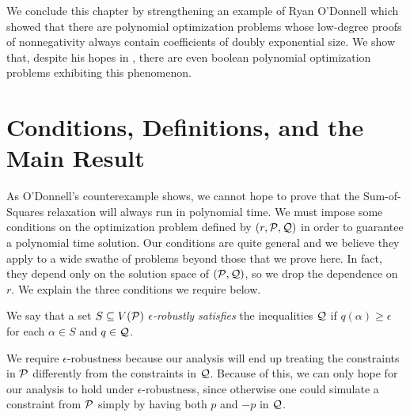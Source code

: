 We conclude this chapter by strengthening an example of Ryan O'Donnell which showed that there are polynomial optimization problems whose low-degree proofs of nonnegativity always contain coefficients of doubly exponential size. We show that, despite his hopes in \cite{ODon16}, there are even boolean polynomial optimization problems exhibiting this phenomenon. 

\section{Conditions, Definitions, and the Main Result}
As O'Donnell's counterexample shows, we cannot hope to prove that the Sum-of-Squares relaxation will always run in polynomial time. We must impose some conditions on the optimization problem defined by $(r, \mathcal P, \mathcal Q)$ in order to guarantee a polynomial time solution. Our conditions are quite general and we believe they apply to a wide swathe of problems beyond those that we prove here. In fact, they depend only on the solution space of $(\mathcal P, \mathcal Q)$, so we drop the dependence on $r$. We explain the three conditions we require below.

\begin{definition}
We say that a set $S \subseteq V(\mathcal P)$ \emph{$\epsilon$-robustly satisfies} the inequalities $\mathcal Q$ if $q(\alpha) \geq \epsilon$ for each $\alpha \in S$ and $q \in \mathcal Q$. 
\end{definition}
We require $\epsilon$-robustness because our analysis will end up treating the constraints in $\mathcal P$ differently from the constraints in $\mathcal Q$.
Because of this, we can only hope for our analysis to hold under $\epsilon$-robustness, since otherwise one could simulate a constraint from $\mathcal P$ simply by having both $p$ and $-p$ in $\mathcal Q$. 

